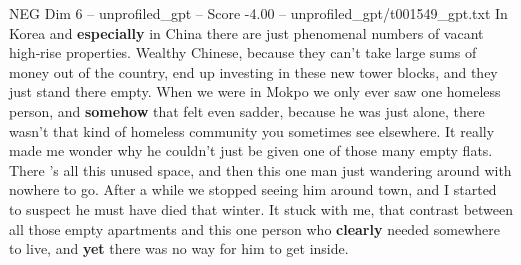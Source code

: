 \begin{textsample}{NEG Dim 6 – unprofiled\_gpt – Score -4.00 – unprofiled\_gpt/t001549\_gpt.txt}  \label{ex:f6_neg_021}
In Korea and \textbf{especially} in China there are just phenomenal numbers of vacant high‑rise properties.
Wealthy Chinese, because they can't take large sums of money out of the country, end up investing in these new tower blocks, and they just stand there empty.
When we were in Mokpo we only ever saw one homeless person, and \textbf{somehow} that felt even sadder, because he was just alone, there wasn't that kind of homeless community you sometimes see elsewhere.
It really made me wonder why he couldn't just be given one of those many empty flats.
There ’s all this unused space, and then this one man just wandering around with nowhere to go.
After a while we stopped seeing him around town, and I started to suspect he must have died that winter.
It stuck with me, that contrast between all those empty apartments and this one person who \textbf{clearly} needed somewhere to live, and \textbf{yet} there was no way for him to get inside.

\end{textsample}

